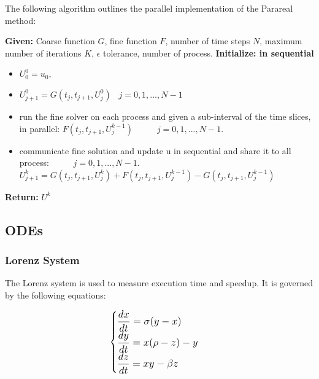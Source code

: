 \documentclass[a4paper,12pt,french]{article}
\begin{document}
\newpage
The following algorithm outlines the parallel implementation of the Parareal method:
\begin{algorithm}
\caption{Parareal Algorithm (parallel)} 
\begin{algorithmic}[1]
\STATE \textbf{Given:} Coarse function $G$, fine function $F$, number of time steps $N$, maximum number of iterations $K$, $\epsilon$ tolerance, number of process.
\STATE \textbf{Initialize: in sequential} \begin{itemize}
    \item  $U_0^0 = u_0$,
    \item $ U_{j+1}^0 = G(t_j,t_{j+1}, U_j^0) \;\;\;j = 0,1, \ldots, N-1$
\end{itemize}
    \begin{itemize}
        \item run the fine solver on each process and given a sub-interval of the time slices, in parallel: $F(t_j,t_{j+1}, U_j^{k-1}) \;\;\;\;\;\;\;\;\;\; j = 0,1, ... ,N-1$.
        \item communicate fine solution and update u in sequential and share it to all process: $\;\;\;\;\;\;\;\;\; j = 0,1, ... ,N-1$.
        \newline
        $ U_{j+1}^k = G(t_j,t_{j+1},U_j^k) + F(t_j,t_{j+1},U_j^{k-1}) -G(t_j,t_{j+1},U_j^{k-1})$
    \end{itemize}
\ENDWHILE
\STATE \textbf{Return:} $U^k$
\end{algorithmic}
\end{algorithm}
\newpage
\subsection{ODEs}

\subsubsection{Lorenz System}
The Lorenz system \cite{lorenz1963deterministic} is used to measure execution time and speedup. It is governed by the following equations:

\begin{equation}
\large
\begin{cases}
    \displaystyle\frac{dx}{dt} = \sigma(y - x) \\
    \displaystyle\frac{dy}{dt} = x(\rho - z) - y \\
    \displaystyle\frac{dz}{dt} = xy - \beta z
\end{cases}
\normalsize
\end{equation}\\
   
\end{document}
